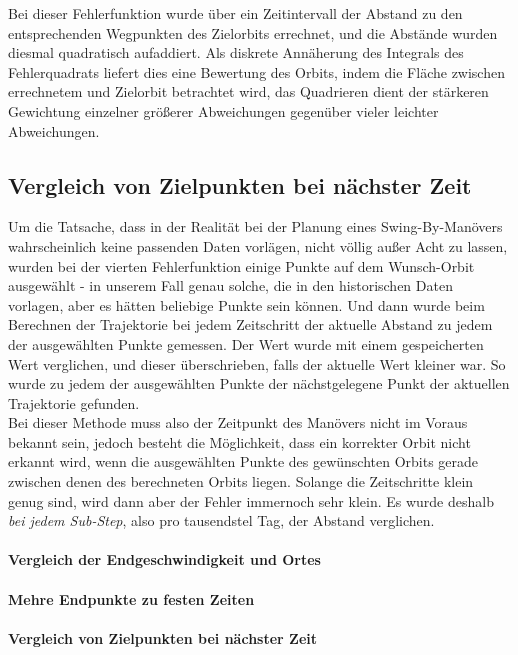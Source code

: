 Bei dieser Fehlerfunktion wurde über ein Zeitintervall der Abstand zu den entsprechenden Wegpunkten des Zielorbits errechnet, und die Abstände wurden diesmal quadratisch aufaddiert. Als diskrete Annäherung des Integrals des Fehlerquadrats liefert dies eine Bewertung des Orbits, indem die Fläche zwischen errechnetem und Zielorbit betrachtet wird, das Quadrieren dient der stärkeren Gewichtung einzelner größerer Abweichungen gegenüber vieler leichter Abweichungen.


\subsection{Vergleich von Zielpunkten bei nächster Zeit}

Um die Tatsache, dass in der Realität bei der Planung eines Swing-By-Manövers wahrscheinlich keine passenden Daten vorlägen, nicht völlig außer Acht zu lassen, wurden bei der vierten Fehlerfunktion einige Punkte auf dem Wunsch-Orbit ausgewählt - in unserem Fall genau solche, die in den historischen Daten vorlagen, aber es hätten beliebige Punkte sein können. Und dann wurde beim Berechnen der Trajektorie bei jedem Zeitschritt der aktuelle Abstand zu jedem der ausgewählten Punkte gemessen. Der Wert wurde mit einem gespeicherten Wert verglichen, und dieser überschrieben, falls der aktuelle Wert kleiner war. So wurde zu jedem der ausgewählten Punkte der nächstgelegene Punkt der aktuellen Trajektorie gefunden.\\
Bei dieser Methode muss also der Zeitpunkt des Manövers nicht im Voraus bekannt sein, jedoch besteht die Möglichkeit, dass ein korrekter Orbit nicht erkannt wird, wenn die ausgewählten Punkte des gewünschten Orbits gerade zwischen denen des berechneten Orbits liegen. Solange die Zeitschritte klein genug sind, wird dann aber der Fehler immernoch sehr klein. Es wurde deshalb \textit{bei jedem Sub-Step}, also pro tausendstel Tag, der Abstand verglichen.





\paragraph{Vergleich der Endgeschwindigkeit und Ortes}
\paragraph{Mehre Endpunkte zu festen Zeiten}
\paragraph{Vergleich von Zielpunkten bei nächster Zeit}
